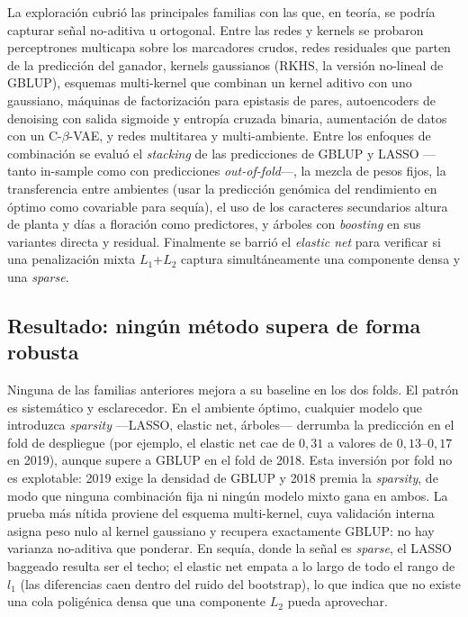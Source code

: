 La exploración cubrió las principales familias con las que, en teoría, se podría capturar
señal no-aditiva u ortogonal. Entre las redes y kernels se probaron perceptrones
multicapa sobre los marcadores crudos, redes residuales que parten de la predicción del
ganador, kernels gaussianos (RKHS, la versión no-lineal de GBLUP), esquemas multi-kernel
que combinan un kernel aditivo con uno gaussiano, máquinas de factorización para epistasis
de pares, autoencoders de denoising con salida sigmoide y entropía cruzada binaria,
aumentación de datos con un C-$\beta$-VAE, y redes multitarea y multi-ambiente. Entre los
enfoques de combinación se evaluó el \emph{stacking} de las predicciones de GBLUP y LASSO
—tanto in-sample como con predicciones \emph{out-of-fold}—, la mezcla de pesos fijos, la
transferencia entre ambientes (usar la predicción genómica del rendimiento en óptimo como
covariable para sequía), el uso de los caracteres secundarios altura de planta y días a
floración como predictores, y árboles con \emph{boosting} en sus variantes directa y
residual. Finalmente se barrió el \emph{elastic net} para verificar si una penalización
mixta $L_1$+$L_2$ captura simultáneamente una componente densa y una \emph{sparse}.

\subsection{Resultado: ningún método supera de forma robusta}

Ninguna de las familias anteriores mejora a su baseline en los dos folds. El patrón es
sistemático y esclarecedor. En el ambiente óptimo, cualquier modelo que introduzca
\emph{sparsity} —LASSO, elastic net, árboles— derrumba la predicción en el fold de
despliegue (por ejemplo, el elastic net cae de $0{,}31$ a valores de $0{,}13$--$0{,}17$ en
2019), aunque supere a GBLUP en el fold de 2018. Esta inversión por fold no es explotable:
2019 exige la densidad de GBLUP y 2018 premia la \emph{sparsity}, de modo que ninguna
combinación fija ni ningún modelo mixto gana en ambos. La prueba más nítida proviene del
esquema multi-kernel, cuya validación interna asigna peso nulo al kernel gaussiano y
recupera exactamente GBLUP: no hay varianza no-aditiva que ponderar. En sequía, donde la
señal es \emph{sparse}, el LASSO baggeado resulta ser el techo; el elastic net empata a lo
largo de todo el rango de $l_1$ (las diferencias caen dentro del ruido del bootstrap), lo
que indica que no existe una cola poligénica densa que una componente $L_2$ pueda
aprovechar.

